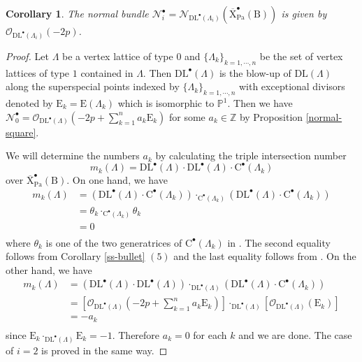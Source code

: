 \documentclass[10pt]{amsart}
\numberwithin{equation}{section}
\newtheorem{corollary}[equation]{Corollary}
\theoremstyle{definition}
\def\Pa{\mathrm{Pa}}
\def\calN{\mathcal{N}}
\def\calO{\mathcal{O}}
\def\PP{\mathbb{P}}
\def\ZZ{\mathbb{Z}}
\def\rmB{\mathrm{B}}
\def\rmC{\mathrm{C}}
\def\rmE{\mathrm{E}}
\def\rmX{\mathrm{X}}
\begin{document}
\begin{corollary}\label{intersection-number}
The normal bundle $\calN^{\bullet}_{i}=\calN_{\mathrm{DL}^{\bullet}(\Lambda_{i})}({\overline{\rmX}^{\bullet}_{\Pa}(\rmB)})$ is given by $\calO_{\mathrm{DL}^{\bullet}(\Lambda_{i})}(-2p)$.
\end{corollary}
\begin{proof}
Let $\Lambda$ be a vertex lattice of type $0$ and $\{\Lambda_{k}\}_{k=1,\cdots, n}$ be the set of vertex lattices of type $1$ contained in $\Lambda$.  Then $\mathrm{DL}^{\bullet}(\Lambda)$ is the blow-up of $\mathrm{DL}(\Lambda)$ along the superspecial points indexed by $\{\Lambda_{k}\}_{k=1,\cdots, n}$ with exceptional divisors denoted by $\rmE_{k}=\rmE(\Lambda_{k})$ which is isomorphic to $\PP^{1}$. Then we have $\calN^{\bullet}_{0}=\calO_{\mathrm{DL}^{\bullet}(\Lambda)}(-2p+\sum^{n}_{k=1}a_{k}\rmE_{k})$ for some $a_{k}\in\ZZ$ by Proposition \ref{normal-square}.

We will determine the numbers $a_{k}$ by calculating the triple intersection number 
\begin{equation*}
{m}_{k}(\Lambda)=\mathrm{DL}^{\bullet}(\Lambda)\cdot\mathrm{DL}^{\bullet}(\Lambda)\cdot\rmC^{\bullet}(\Lambda_{k})
\end{equation*}
over $\overline{\rmX}^{\bullet}_{\Pa}(\rmB)$. On one hand, we have 
\begin{equation*}
\begin{aligned}
{m}_{k}(\Lambda)&=(\mathrm{DL}^{\bullet}(\Lambda)\cdot\rmC^{\bullet}(\Lambda_{k}))\cdot_{\rmC^{\bullet}(\Lambda_{k})}(\mathrm{DL}^{\bullet}(\Lambda)\cdot\rmC^{\bullet}(\Lambda_{k}))\\
&=\theta_{k}\cdot_{\rmC^{\bullet}(\Lambda_{k})}\theta_{k}\\
&=0\\
\end{aligned}
\end{equation*}
where $\theta_{k}$ is one of the two generatrices of $\rmC^{\bullet}(\Lambda_{k})$ in \cite[Expose XII Theorem 3.3]{SGA7}. The second equality follows from Corollary \ref{ss-bullet} $(5)$  and the last equality follows from \cite[Expose XII Theorem 3.3 iii (b)]{SGA7}. On the other hand, we have
\begin{equation*}
\begin{aligned}
{m}_{k}(\Lambda)&=(\mathrm{DL}^{\bullet}(\Lambda)\cdot\mathrm{DL}^{\bullet}(\Lambda))\cdot_{\mathrm{DL}^{\bullet}(\Lambda)}(\mathrm{DL}^{\bullet}(\Lambda)\cdot\rmC^{\bullet}(\Lambda_{k}))\\
&=[\calO_{\mathrm{DL}^{\bullet}(\Lambda)}(-2p+\sum^{n}_{k=1}a_{k}\rmE_{k})]\cdot_{\mathrm{DL}^{\bullet}(\Lambda)}[\calO_{\mathrm{DL}^{\bullet}(\Lambda)}(\rmE_{k})]\\
&=-a_{k}\\
\end{aligned}
\end{equation*}
since $\rmE_{k}\cdot_{\mathrm{DL}^{\bullet}(\Lambda)}\rmE_{k}=-1$. Therefore $a_{k}=0$ for each $k$ and we are done. The case of $i=2$ is proved in the same way.
\end{proof}
\end{document}
